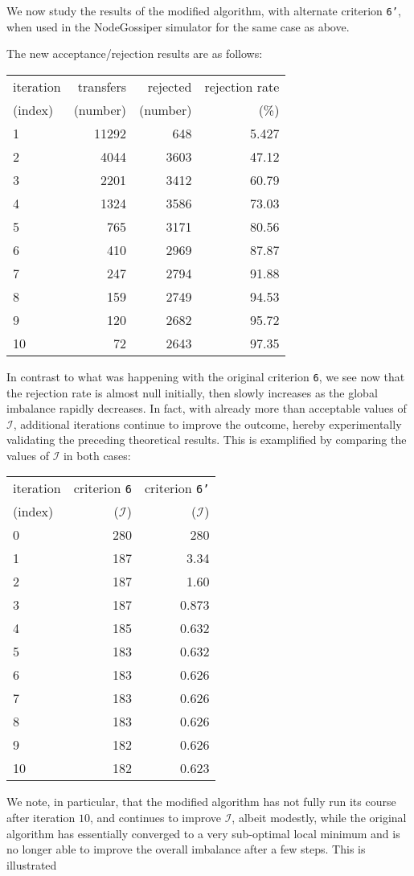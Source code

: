 We now study the results of the modified algorithm, with alternate
criterion \texttt{6'}, when used in the \textsf{NodeGossiper}
simulator for the same case as above.

The new acceptance/rejection results are as follows:
\begin{center}
\begin{tabular}{lrrr}
\hline
iteration & transfers & rejected & rejection rate\\
(index)   & (number)  & (number) & (\%)\\
\hline\hline
 1 & 11292 &  648 & 5.427\\
 2 &  4044 & 3603 & 47.12\\
 3 &  2201 & 3412 & 60.79\\
 4 &  1324 & 3586 & 73.03\\
 5 &   765 & 3171 & 80.56\\
 6 &   410 & 2969 & 87.87\\
 7 &   247 & 2794 & 91.88\\
 8 &   159 & 2749 & 94.53\\
 9 &   120 & 2682 & 95.72\\
10 &    72 & 2643 & 97.35\\
\hline
\end{tabular}
\end{center}

In contrast to what was happening with the original criterion
\texttt{6}, we see now that the rejection rate is almost null
initially, then slowly increases as the global imbalance rapidly decreases.
In fact, with already more than acceptable values of $\mathcal{I}$,
additional iterations continue to improve the outcome, hereby
experimentally validating the preceding theoretical results. This is
examplified by comparing the values of $\mathcal{I}$ in both cases:
\begin{center}
\begin{tabular}{lrr}
\hline
iteration & criterion \texttt{6}  & criterion \texttt{6'} \\
(index)   & ($\mathcal{I}$) & ($\mathcal{I}$) \\
\hline\hline
 0 & 280 &   280\\
 1 & 187 &  3.34\\
 2 & 187 &  1.60\\
 3 & 187 & 0.873\\
 4 & 185 & 0.632\\
 5 & 183 & 0.632 \\
 6 & 183 & 0.626 \\
 7 & 183 & 0.626 \\
 8 & 183 & 0.626 \\
 9 & 182 & 0.626 \\
10 & 182 & 0.623 \\
\hline
\end{tabular}
\end{center}
We note, in particular, that the modified algorithm has not fully run
its course after iteration $10$, and continues to improve
$\mathcal{I}$, albeit modestly, while the original algorithm has
essentially converged to a very sub-optimal local minimum and is no
longer able to improve the overall imbalance after a few steps.
This is illustrated 


